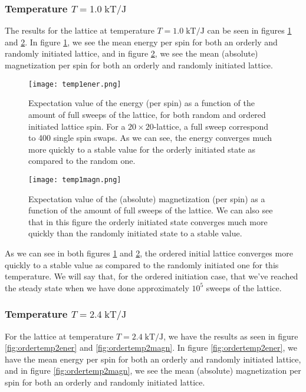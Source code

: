 \documentclass[reprint,english,notitlepage]{revtex4-1}  %
\begin{document}
\subsubsection{Temperature $T = 1.0\;\text{kT/J}$}

The results for the lattice at temperature $T = 1.0\;\text{kT/J}$ can be seen in figures \ref{fig:randtemp1ener} and \ref{fig:randtemp1magn}. In figure \ref{fig:randtemp1ener}, we see the mean energy per spin for both an orderly and randomly initiated lattice, and in figure \ref{fig:randtemp1magn}, we see the mean (absolute) magnetization per spin for both an orderly and randomly initiated lattice.

\begin{figure}[h!]
    \centering
    \texttt{[image: temp1ener.png]}
    \caption{Expectation value of the energy (per spin) as a function of the amount of full sweeps of the lattice, for both random and ordered initiated lattice spin. For a $20\times20$-lattice, a full sweep correspond to 400 single spin swaps. As we can see, the energy converges much more quickly to a stable value for the orderly initiated state as compared to the random one.}
    \label{fig:randtemp1ener}
\end{figure}

\begin{figure}[h!]
    \centering
    \texttt{[image: temp1magn.png]}
    \caption{Expectation value of the (absolute) magnetization (per spin) as a function of the amount of full sweeps of the lattice. We can also see that in this figure the orderly initiated state converges much more quickly than the randomly initiated state to a stable value.}
    \label{fig:randtemp1magn}
\end{figure}

As we can see in both figures \ref{fig:randtemp1ener} and \ref{fig:randtemp1magn}, the ordered initial lattice converges more quickly to a stable value as compared to the randomly initiated one for this temperature. We will say that, for the ordered initiation case, that we've reached the steady state when we have done approximately $10^5$ sweeps of the lattice.

\subsubsection{Temperature $T = 2.4\;\text{kT/J}$}

For the lattice at temperature $T = 2.4\;\text{kT/J}$, we have the results as seen in figure \ref{fig:ordertemp2ener} and \ref{fig:ordertemp2magn}. In figure \ref{fig:ordertemp2ener}, we have the mean energy per spin for both an orderly and randomly initiated lattice, and in figure \ref{fig:ordertemp2magn}, we see the mean (absolute) magnetization per spin for both an orderly and randomly initiated lattice.
\end{document}
